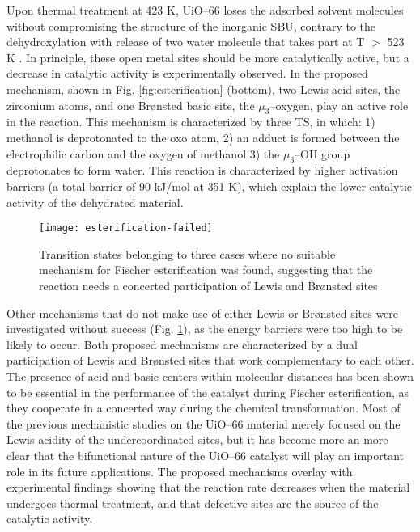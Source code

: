 Upon thermal treatment at 423 K, UiO--66 loses the adsorbed solvent molecules without compromising the structure of the inorganic SBU, contrary to the dehydroxylation with release of two water molecule that takes part at T $>$ 523 K \cite{shearer2013situ}. In principle, these open metal sites should be more catalytically active, but a decrease in catalytic activity is experimentally observed. In the proposed mechanism, shown in Fig. \ref{fig:esterification} (bottom), two Lewis acid sites, the zirconium atoms, and one Br\o{}nsted basic site, the $\mu_3$--oxygen, play an active role in the reaction. This mechanism is characterized by three TS, in which: 1) methanol is deprotonated to the oxo atom, 2) an adduct is formed between the electrophilic carbon and the oxygen of methanol 3) the $\mu_3$--OH group deprotonates to form water. This reaction is characterized by higher activation barriers (a total barrier of 90 kJ/mol at 351 K), which explain the lower catalytic activity of the dehydrated material.
\npar
\begin{figure}[!htbp]
	\centering
	\texttt{[image: esterification-failed]}
	\caption{Transition states belonging to three cases where no suitable mechanism for Fischer esterification was found, suggesting that the reaction needs a concerted participation of Lewis and Br\o{}nsted sites}
	\label{fig:esterification-failed}
\end{figure}
Other mechanisms that do not make use of either Lewis or Br\o{}nsted sites were investigated without success (Fig. \ref{fig:esterification-failed}), as the energy barriers were too high to be likely to occur. Both proposed mechanisms are characterized by a dual participation of Lewis and Br\o{}nsted sites that work complementary to each other. The presence of acid and basic centers within molecular distances has been shown to be essential in the performance of the catalyst during Fischer esterification, as they cooperate in a concerted way during the chemical transformation. Most of the previous mechanistic studies on the UiO--66 material merely focused on the Lewis acidity of the undercoordinated sites, but it has become more an more clear that the bifunctional nature of the UiO--66 catalyst will play an important role in its future applications.
\npar
The proposed mechanisms overlay with experimental findings showing that the reaction rate decreases when the material undergoes thermal treatment, and that defective sites are the source of the catalytic activity.

